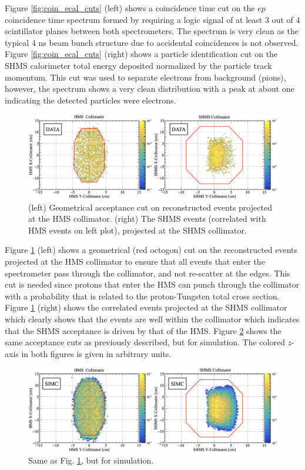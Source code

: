 \documentclass[aps, prl]{revtex4-2}  %
\begin{document}
\indent Figure \ref{fig:coin_ecal_cuts} (left) shows a coincidence time cut on the $ep$ coincidence time spectrum formed by requiring a logic signal of
at least 3 out of 4 scintillator planes between both spectrometers. The spectrum is very clean as the typical 4 ns beam bunch structure due to accidental
coincidences is not observed. Figure \ref{fig:coin_ecal_cuts} (right) shows a particle identification cut on the SHMS calorimeter total energy
deposited normalized by the particle track momentum. This cut was used to separate electrons from background (pions), however, the spectrum shows a very clean distribution
with a peak at about one indicating the detected particles were electrons.
\begin{figure}[!h]
\includegraphics[scale=0.24]{plots/collimator_CUT_80MeV_35deg_data.png}
\caption{(left) Geometrical acceptance cut on reconstructed events projected at the HMS collimator. (right) The SHMS events (correlated with HMS events on left plot),
  projected at the SHMS collimator.}
\label{fig:data_coll_cuts}
\end{figure}
\clearpage
\indent Figure \ref{fig:data_coll_cuts} (left) shows a geometrical (red octogon) cut on the reconstructed events projected at the HMS collimator to ensure
that all events that enter the spectrometer pass through the collimator, and not re-scatter at the edges. This cut is needed since protons that enter the
HMS can punch through the collimator with a probability that is related to the proton-Tungsten total cross section. Figure \ref{fig:data_coll_cuts} (right)
shows the correlated events projected at the SHMS collimator which clearly shows that the events are well within the collimator which indicates that the SHMS
acceptance is driven by that of the HMS. Figure \ref{fig:simc_coll_cuts} shows the same acceptance cuts as previously described, but for simulation. The colored
$z$-axis in both figures is given in arbitrary units.\\
\begin{figure}[!h]
\includegraphics[scale=0.24]{plots/collimator_CUT_80MeV_35deg_SIMC.png}
\caption{Same as Fig. \ref{fig:data_coll_cuts}, but for simulation.}
\label{fig:simc_coll_cuts}
\end{figure}
\end{document}

